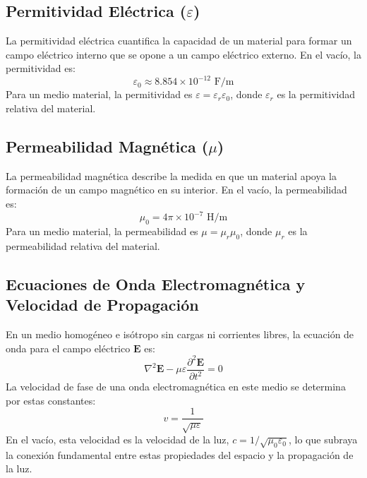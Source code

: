 \documentclass{book}
\begin{document}
\subsection*{Permitividad Eléctrica ($\varepsilon$)}
La permitividad eléctrica cuantifica la capacidad de un material para formar un campo eléctrico interno que se opone a un campo eléctrico externo. En el vacío, la permitividad es:
\begin{equation}
    \varepsilon_0 \approx 8.854 \times 10^{-12} \text{ F/m}
    \label{eq:epsilon_0}
\end{equation}
Para un medio material, la permitividad es $\varepsilon = \varepsilon_r \varepsilon_0$, donde $\varepsilon_r$ es la permitividad relativa del material.

\subsection*{Permeabilidad Magnética ($\mu$)}
La permeabilidad magnética describe la medida en que un material apoya la formación de un campo magnético en su interior. En el vacío, la permeabilidad es:
\begin{equation}
    \mu_0 = 4\pi \times 10^{-7} \text{ H/m}
    \label{eq:mu_0}
\end{equation}
Para un medio material, la permeabilidad es $\mu = \mu_r \mu_0$, donde $\mu_r$ es la permeabilidad relativa del material.

\subsection*{Ecuaciones de Onda Electromagnética y Velocidad de Propagación}
En un medio homogéneo e isótropo sin cargas ni corrientes libres, la ecuación de onda para el campo eléctrico $\mathbf{E}$ es:
\begin{equation}
    \nabla^2 \mathbf{E} - \mu \varepsilon \frac{\partial^2 \mathbf{E}}{\partial t^2} = 0
    \label{eq:onda_electromagnetica}
\end{equation}
La velocidad de fase de una onda electromagnética en este medio se determina por estas constantes:
\begin{equation}
    v = \frac{1}{\sqrt{\mu \varepsilon}}
    \label{eq:velocidad_onda}
\end{equation}
En el vacío, esta velocidad es la velocidad de la luz, $c = 1/\sqrt{\mu_0 \varepsilon_0}$, lo que subraya la conexión fundamental entre estas propiedades del espacio y la propagación de la luz.
\end{document}
